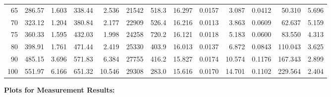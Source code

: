 \documentclass[10pt]{article}
\begin{document}
{\begin{tabular}{|r|rr|rr|rr|rr|rr|r|r|}
       65 &       286.57 &        1.603 &       338.44 &        2.536 &        21542 &        518.3 &       16.297 &       0.0157 &        3.087 &       0.0412 &       50.310 &        5.696 \\
       70 &       323.12 &        1.204 &       380.84 &        2.177 &        22909 &        526.4 &       16.216 &       0.0113 &        3.863 &       0.0609 &       62.637 &        5.159 \\
       75 &       360.33 &        1.595 &       432.03 &        1.998 &        24258 &        720.2 &       16.121 &       0.0118 &        5.183 &       0.0600 &       83.550 &        4.313 \\
       80 &       398.91 &        1.761 &       471.44 &        2.419 &        25330 &        403.9 &       16.013 &       0.0137 &        6.872 &       0.0843 &      110.043 &        3.625 \\
       90 &       485.15 &        3.696 &       571.83 &        6.384 &        27755 &        416.2 &       15.827 &       0.0174 &       10.574 &       0.1176 &      167.343 &        2.899 \\
      100 &       551.97 &        6.166 &       651.32 &       10.546 &        29308 &        283.0 &       15.616 &       0.0170 &       14.701 &       0.1102 &      229.564 &        2.404 \\
\hline
\end{tabular}
}


\vspace{3mm}




\pagebreak
\noindent
{\large \bf Plots for Measurement Results:}
\vspace{5mm}
\end{document}
